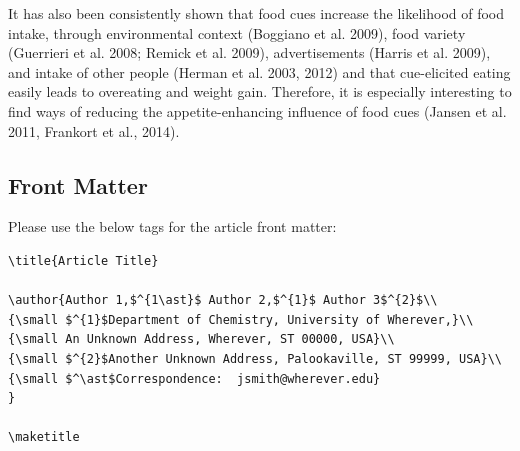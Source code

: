 \documentclass[]{imag-ms-template}
\begin{document}
It has also been consistently shown that food cues increase the likelihood of food intake, through environmental context \cite{}(Boggiano et al. 2009), food variety (Guerrieri et al. 2008; Remick et al. 2009), advertisements (Harris et al. 2009), and intake of other people (Herman et al. 2003, 2012) and that cue-elicited eating easily leads to overeating and weight gain. Therefore, it is especially interesting to find ways of reducing the appetite-enhancing influence of food cues (Jansen et al. 2011, Frankort et al., 2014).




\newpage

\subsection{Front Matter}

Please use the below tags for the article front matter:

\begin{verbatim}
\title{Article Title} 

\author{Author 1,$^{1\ast}$ Author 2,$^{1}$ Author 3$^{2}$\\
{\small $^{1}$Department of Chemistry, University of Wherever,}\\
{\small An Unknown Address, Wherever, ST 00000, USA}\\
{\small $^{2}$Another Unknown Address, Palookaville, ST 99999, USA}\\
{\small $^\ast$Correspondence:  jsmith@wherever.edu}
}

\maketitle
\end{verbatim}
\end{document}
